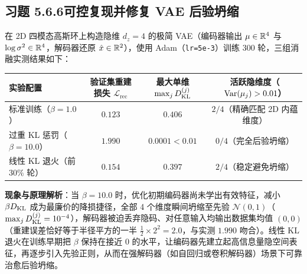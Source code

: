 \subsection*{习题 5.6.6\quad 可控复现并修复 VAE 后验坍缩}
在 2D 四模态高斯环上构造隐维 $d_z = 4$ 的极简 VAE（编码器输出 $\mu \in \mathbb{R}^4$ 与 $\log\sigma^2 \in \mathbb{R}^4$，解码器还原 $\hat{x} \in \mathbb{R}^2$），使用 Adam（\texttt{lr=5e-3}）训练 300 轮，三组消融实测结果如下：
\begin{center}
\small
\begin{tabular}{@{}lccc@{}}
\toprule
实验配置 & 验证集重建损失 $\mathcal{L}_{\text{rec}}$ & 最大单维 $\max_j D_{\mathrm{KL}}^{(j)}$ & 活跃隐维度（$\operatorname{Var}(\mu_j) > 0.01$） \\
\midrule
标准训练（$\beta = 1.0$） & $0.123$ & $0.406$ & $2 / 4$（精确匹配 2D 内蕴维度） \\
过重 KL 惩罚（$\beta = 10.0$） & $1.990$ & $0.0001 < 0.01$ & $0 / 4$（完全后验坍缩） \\
线性 KL 退火（前 $30\%$ 轮） & $0.154$ & $0.397$ & $2 / 4$（稳定避免坍缩） \\
\bottomrule
\end{tabular}
\end{center}
\textbf{现象与原理解析}：当 $\beta = 10.0$ 时，优化初期编码器尚未学出有效特征，减小 $\beta D_{\mathrm{KL}}$ 成为最廉价的降损捷径，全部 4 个维度瞬间坍缩至先验 $\mathcal{N}(0, 1)$（$\max_j D_{\mathrm{KL}}^{(j)} = 10^{-4}$），解码器被迫丢弃隐码、对任意输入均输出数据集均值 $(0, 0)$（重建误差恰好等于半径平方的一半 $\frac{1}{2}\times 2^2 = 2.0$，与实测 $1.990$ 吻合）。线性 KL 退火在训练早期把 $\beta$ 保持在接近 $0$ 的水平，让编码器先建立起高信息量隐空间表征，再逐步引入先验正则，从而在强解码器（如自回归或卷积解码器）场景下可靠治愈后验坍缩。

